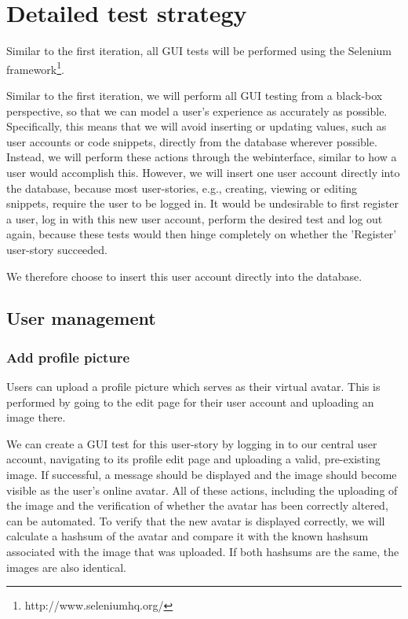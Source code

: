 \documentclass[10pt,a4paper,BCOR12mm, headexclude, footexclude,
  twoside, openright]{scrartcl}
\numberwithin{equation}{section} %
\numberwithin{figure}{section} %
\numberwithin{table}{section} %
\begin{document}
\pagestyle{plain}

\section{Detailed test strategy}

Similar to the first iteration, all GUI tests will be performed using the Selenium framework\footnote{http://www.seleniumhq.org/}.

Similar to the first iteration, we will perform all GUI testing from a black-box perspective, so that we can model a user's experience as accurately as possible.
Specifically, this means that we will avoid inserting or updating values, such as user accounts or code snippets, directly from the database wherever possible.
Instead, we will perform these actions through the webinterface, similar to how a user would accomplish this.
However, we will insert one user account directly into the database, because most user-stories, e.g., creating, viewing or editing snippets, require the user to be logged in.
It would be undesirable to first register a user, log in with this new user account, perform the desired test and log out again, because these tests would then hinge completely on whether the 'Register' user-story succeeded.

We therefore choose to insert this user account directly into the database.

\subsection{User management}

\subsubsection*{Add profile picture}

Users can upload a profile picture which serves as their virtual avatar. This is performed by going to the edit page for their user account and uploading an image there.

We can create a GUI test for this user-story by logging in to our central user account, navigating to its profile edit page and uploading a valid, pre-existing image. If successful, a message should be displayed and the image should become visible as the user's online avatar.
All of these actions, including the uploading of the image and the verification of whether the avatar has been correctly altered, can be automated.
To verify that the new avatar is displayed correctly, we will calculate a hashsum of the avatar and compare it with the known hashsum associated with the image that was uploaded.
If both hashsums are the same, the images are also identical.
\end{document}
